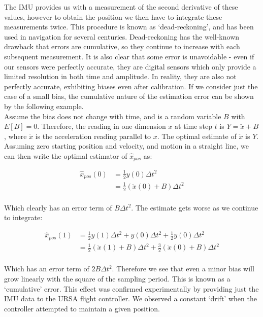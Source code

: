 \documentclass[capstone_report.tex]{subfiles}
\begin{document}
The IMU provides us with a measurement of the second derivative of these values, however to obtain the position we then have to integrate these measurements twice. This procedure is known as `dead-reckoning', and has been used in navigation for several centuries. Dead-reckoning has the well-known drawback that errors are cumulative, so they continue to increase with each subsequent measurement. It is also clear that some error is unavoidable - even if our sensors were perfectly accurate, they are digital sensors which only provide a limited resolution in both time and amplitude. In reality, they are also not perfectly accurate, exhibiting biases even after calibration. If we consider just the case of a small bias, the cumulative nature of the estimation error can be shown by the following example.\\ 

Assume the bias does not change with time, and is a random variable $B$ with $E[B]=0$. Therefore, the reading in one dimension $x$ at time step $t$ is $Y=\ddot{x}+B$, where $\ddot{x}$ is the acceleration reading parallel to $x$. The optimal estimate of $\ddot{x}$ is $Y$. Assuming zero starting position and velocity, and motion in a straight line, we can then write the optimal estimator of $\hat{x}_{pos}$ as:

\begin{align*}
	\hat{x}_{pos}(0)&=\frac{1}{2}y(0)\Delta t^2\\
	&=\frac{1}{2}(\ddot{x}(0)+B)\Delta t^2\\
\end{align*}

Which clearly has an error term of $B\Delta t^2$. The estimate gets worse as we continue to integrate:

\begin{align*}
\hat{x}_{pos}(1)&=\frac{1}{2}y(1)\Delta t^2+y(0)\Delta t^2+\frac{1}{2}y(0)\Delta t^2\\
&=\frac{1}{2}(\ddot{x}(1)+B)\Delta t^2+\frac{3}{2}(\ddot{x}(0)+B)\Delta t^2\\   	
\end{align*}

Which has an error term of $2B\Delta t^2$. Therefore we see that even a minor bias will grow linearly with the square of the sampling period. This is known as a `cumulative' error. This effect was confirmed experimentally by providing just the IMU data to the URSA flight controller. We observed a constant `drift' when the controller attempted to maintain a given position.\\
\end{document}
